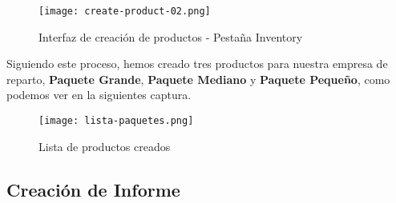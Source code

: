 \begin{figure}[h]
    \centering
    \texttt{[image: create-product-02.png]}
    \caption{Interfaz de creación de productos - Pestaña Inventory}
\end{figure}

Siguiendo este proceso, hemos creado tres productos para nuestra empresa de reparto, \textbf{Paquete Grande}, \textbf{Paquete Mediano} y \textbf{Paquete Pequeño}, como podemos ver en la siguientes captura.

\begin{figure}[h]
    \centering
    \texttt{[image: lista-paquetes.png]}
    \caption{Lista de productos creados}
\end{figure}

\subsection{Creación de Informe}
















\newpage



